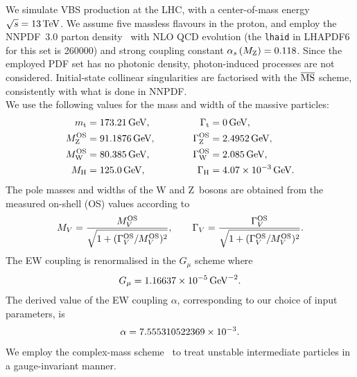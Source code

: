We simulate VBS production at the LHC, with a center-of-mass energy $\sqrt s = 13 \,\text{TeV}$. We assume five massless flavours in the proton, and employ the NNPDF~3.0 parton 
density~\cite{Ball:2014uwa}
with NLO QCD evolution (the {\tt lhaid} in LHAPDF6~\cite{Buckley:2014ana} for this set is 260000) and strong coupling constant $\alpha_s\left( M_\text{Z} \right) = 0.118$. Since
the employed PDF set has no photonic density, photon-induced processes are not considered. Initial-state collinear singularities are factorised with the  ${\overline{\rm MS}}$ 
scheme, consistently with what is done in NNPDF.\\
We use the following values for the mass and width of the massive particles:
% 
\begin{alignat}{2}
                  m_\text{t}   &=  173.21\,\text{GeV},       & \quad \quad \quad \Gamma_\text{t} &= 0 \,\text{GeV},  \nonumber \\
                M_\text{Z}^\text{OS} &=  91.1876\,\text{GeV},      & \quad \quad \quad \Gamma_\text{Z}^\text{OS} &= 2.4952\,\text{GeV},  \nonumber \\
                M_\text{W}^\text{OS} &=  80.385\,\text{GeV},       & \Gamma_\text{W}^\text{OS} &= 2.085\,\text{GeV},  \nonumber \\
                M_{\rm H} &=  125.0\,\text{GeV},       &  \Gamma_\text{H}   &=  4.07 \times 10^{-3}\,\text{GeV}.
\end{alignat}
%
The pole masses and widths of the W and Z~bosons are obtained from the measured on-shell (OS) values \cite{Bardin:1988xt} according to
%
\begin{equation}
M_V = \frac{M_V^\text{OS}}{\sqrt{1+(\Gamma_V^\text{OS}/M_V^\text{OS})^2}},\qquad  
\Gamma_V = \frac{\Gamma_V^\text{OS}}{\sqrt{1+(\Gamma_V^\text{OS}/M_V^\text{OS})^2}}.
\end{equation}
%
The EW coupling is renormalised in the $G_\mu$ scheme \cite{Denner:2000bj} where
\begin{equation}
    G_{\mu}    = 1.16637\times 10^{-5}\,\text{GeV}^{-2}.
\end{equation}
The derived value of the EW coupling $\alpha$, corresponding to our choice of input parameters, is 
\begin{equation}
 \alpha = 7.555310522369 \times 10^{-3}. \\
\end{equation}
We employ the complex-mass scheme~\cite{Denner:1999gp,Denner:2005fg} to treat unstable intermediate particles in a gauge-invariant manner.\\

